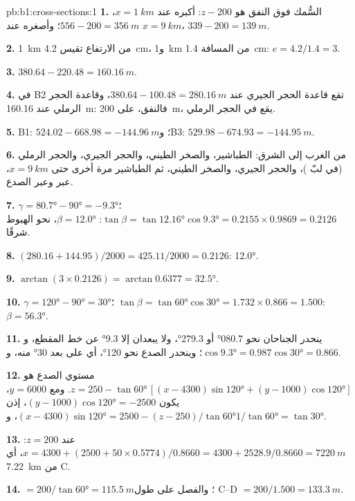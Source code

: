 \begin{solution}{pb:b1:cross-sections:1}
\textbf{1.} السُّمك فوق النفق هو $z - 200$: أكبره عند $x = \qty{1}{km}$، $556 - 200 = \qty{356}{m}$؛ وأصغره عند $x =
\qty{9}{km}$، $339 - 200 = \qty{139}{m}$.

\textbf{2.} \qty{1}{km} من الارتفاع تقيس \qty{4.2}{cm}، و\qty{1}{km} من المسافة \qty{1.4}{cm}: $e = 4.2/1.4 = 3$.

\textbf{3.} $380.64 - 220.48 = \qty{160.16}{m}$.

\textbf{4.} في B2 تقع قاعدة الحجر الجيري عند $380.64 - 100.48 =
\qty{280.16}{m}$، وقاعدة الحجر الرملي عند \qty{160.16}{m}: فالنفق، على \qty{200}{m}، يقع في الحجر الرملي.

\textbf{5.} B1: $524.02 - 668.98 = \qty{-144.96}{m}$؛ وB3: $529.98 - 674.93 =
\qty{-144.95}{m}$.

\textbf{6.} من الغرب إلى الشرق: الطباشير، والصخر الطيني، والحجر الجيري، والحجر الرملي (في لبّ )، والحجر الجيري، والصخر الطيني، ثم الطباشير مرة أخرى حتى $x = \qty{9}{km}$، عبر  وعبر الصدع.

\textbf{7.} $\gamma = \ang{80.7} - \ang{90} = \ang{-9.3}$؛ $\tan\beta =
\tan\ang{12.16}\cos\ang{9.3} = 0.2155\times0.9869 = 0.2126$: $\beta =
\ang{12.0}$، نحو الهبوط شرقًا.

\textbf{8.} $(280.16 + 144.95)/2000 = 425.11/2000 = 0.2126$: \ang{12.0}.

\textbf{9.} $\arctan(3\times0.2126) = \arctan 0.6377 = \ang{32.5}$.

\textbf{10.} $\gamma = \ang{120} - \ang{90} = \ang{30}$؛ $\tan\beta =
\tan\ang{60}\cos\ang{30} = 1.732\times0.866 = 1.500$: $\beta = \ang{56.3}$.

\textbf{11.} ينحدر الجناحان نحو \ang{080.7} أو \ang{279.3}، ولا يبعدان إلا \ang{9.3} عن خط المقطع، و$\cos\ang{9.3} = 0.987$؛ وينحدر الصدع نحو \ang{120}، أي على بعد \ang{30} منه، و$\cos\ang{30} = 0.866$.

\textbf{12.} مستوي الصدع هو $z = 250 - \tan\ang{60}\,[(x - 4300)
\sin\ang{120} + (y - 1000)\cos\ang{120}]$. ومع $y = 6000$، يكون $(y - 1000)
\cos\ang{120} = -2500$، إذن $(x - 4300)\sin\ang{120} = 2500 - (z - 250)/
\tan\ang{60}$، و$1/\tan\ang{60} = \tan\ang{30}$.

\textbf{13.} عند $z = 200$: $x = 4300 + (2500 + 50\times0.5774)/0.8660 =
4300 + 2528.9/0.8660 = \qty{7220}{m}$، أي \qty{7.22}{km} من C.

\textbf{14.}  $= 200/\tan\ang{60} = \qty{115.5}{m}$؛ والفصل على طول C--D $= 200/1.500 = \qty{133.3}{m}$.


\end{solution}
